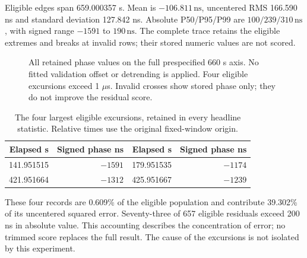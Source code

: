 \documentclass[10pt,letterpaper]{article}
\newcommand{\ns}{\,\mathrm{ns}}\newcommand{\us}{\,\mu\mathrm{s}}\newcommand{\code}[1]{\texttt{#1}}\newcolumntype{L}[1]{>{\RaggedRight\arraybackslash}p{#1}}\renewcommand{\arraystretch}{1.15}
\newcommand{\FineTrace}{(0.95144037500,-114) (1.95144093750,-10) (2.95144143750,-257) (3.95144200000,-204) (4.95144250000,-202) (5.95144306250,-263) (6.95144356250,-187) (7.95144406250,-192) (8.95144462500,-242) (9.95144512500,-218) (10.95144575000,-32) (11.95144625000,-89) (12.95144681250,-140) (13.95144731250,-74) (14.95144787500,-144) (15.95144837500,-138) (16.95144893750,-40) (17.95144943750,-106) (18.95145000000,-75) (19.95145050000,-198) (20.95145106250,-284) (21.95145162500,-94) (22.95145212500,22) (23.95145268750,-239) (24.95145318750,-24) (25.95145368750,-186) (26.95145425000,-166) (27.95145481250,-106) (28.95145531250,-200) (29.95145587500,-29) (30.95145637500,-158) (31.95145693750,-41) (32.95145743750,-193) (33.95145800000,-92) (34.95145856250,98) (35.95145906250,-19) (36.95145962500,-48) (37.95146012500,-239) (38.95146062500,-174) (39.95146118750,-180) (40.95146168750,-224) (41.95146225000,-235) (42.95146275000,-187) (43.95146331250,-168) (44.95146381250,-275) (45.95146431250,-259) (46.95146487500,-225) (47.95146543750,-40) (48.95146593750,-143) (49.95146650000,-97) (50.95146706250,19) (51.95146756250,-7) (52.95146812500,90) (53.95146862500,-38) (54.95146918750,-53) (55.95146968750,-78) (56.95147018750,-237) (57.95147075000,-180) (58.95147125000,-195) (59.95147175000,-150) (60.95147231250,-96) (61.95147281250,-200) (62.95147331250,-226) (63.95147387500,-310) (64.95147437500,-264) (65.95147493750,-176) (66.95147543750,-256) (67.95147600000,-206) (68.95147650000,-19) (69.95147706250,-199) (70.95147762500,-131) (71.95147812500,-224) (72.95147868750,-88) (73.95147918750,-239) (74.95147975000,-97) (75.95148025000,-87) (76.95148081250,11) (77.95148131250,-79) (78.95148187500,-95) (79.95148237500,-256) (80.95148293750,-224) (81.95148343750,-189) (82.95148400000,-65) (83.95148450000,-97) (84.95148506250,-115) (85.95148556250,-110) (86.95148612500,-256) (87.95148662500,-98) (88.95148712500,-22) (89.95148768750,-67) (90.95148818750,8) (91.95148875000,-23) (92.95148931250,-213) (93.95148981250,-121) (94.95149037500,-18) (95.95149087500,-68) (96.95149143750,-39) (97.95149193750,-123) (98.95149250000,-75) (99.95149300000,-102) (100.95149356250,-222) (101.95149406250,-109) (102.95149456250,-130) (103.95149512500,-77) (104.95149568750,-233) (105.95149618750,-84) (106.95149668750,-84) (107.95149725000,-198) (108.95149775000,-165) (109.95149831250,-88) (110.95149881250,-134) (111.95149937500,-166) (112.95149987500,-186) (113.95150043750,-198) (114.95150093750,-103) (115.95150150000,-153) (116.95150200000,-119) (117.95150250000,-123) (118.95150306250,-30) (119.95150356250,-107) (120.95150412500,-100) (121.95150468750,-144) (122.95150518750,-15) (123.95150575000,-199) (124.95150625000,-250) (125.95150675000,-147) (126.95150731250,-109) (127.95150781250,-57) (128.95150837500,-27) (129.95150887500,-149) (130.95150943750,-73) (131.95150993750,-181) (132.95151050000,-212) (133.95151100000,-41) (134.95151150000,-213) (135.95151206250,-71) (136.95151256250,-124) (137.95151312500,-168) (138.95151362500,-109) (139.95151418750,-74) (140.95151468750,-161) (141.95151525000,-1591) (142.95151575000,-354) (143.95151625000,-161) (144.95151681250,-115) (145.95151731250,-163) (146.95151787500,-232) (147.95151837500,-154) (148.95151893750,-97) (149.95151950000,5) (150.95152000000,-25) (151.95152050000,-136) (152.95152106250,-147) (153.95152156250,-54) (154.95152212500,-76) (155.95152262500,-271) (156.95152312500,-175) (157.95152368750,-225) (158.95152418750,-195) (159.95152475000,-62) (160.95152525000,40) (161.95152581250,55) (162.95152631250,17) (163.95152681250,-87) (164.95152737500,-62) (165.95152787500,-251) (166.95152843750,-160) (167.95152893750,-119) (168.95152950000,-33) (169.95153000000,-103) (170.95153050000,-90) (171.95153106250,-20) (172.95153156250,-186) (173.95153212500,-192) (174.95153262500,20) (175.95153318750,20) (176.95153368750,-108) (177.95153418750,-42) (178.95153468750,-134) (179.95153525000,-1174) (180.95153581250,-123) (181.95153631250,-101) (182.95153687500,-170) (183.95153737500,-222) (184.95153787500,-94) (185.95153843750,-13) (186.95153900000,-12) (187.95153950000,-90) (188.95154000000,-118) (189.95154056250,-75) (190.95154106250,-173) (191.95154162500,-197) (192.95154212500,-88) (193.95154268750,-48) (194.95154318750,-196) (195.95154368750,-137) (196.95154425000,-215) (197.95154475000,58) (198.95154525000,-78) (199.95154581250,-73) (200.95154631250,-177) (201.95154687500,-77) (202.95154737500,-84) (203.95154793750,-84) (204.95154843750,-53) (205.95154893750,-107) (206.95154943750,-283) (207.95155000000,-243) (208.95155050000,-279) (209.95155100000,-48) (210.95155156250,-14) (211.95155212500,81) (212.95155262500,-118) (213.95155318750,-19) (214.95155368750,-158) (215.95155418750,-195) (216.95155475000,-163) (217.95155525000,-197) (218.95155575000,-283) (219.95155631250,-213) (220.95155687500,-108) (221.95155737500,59) (222.95155787500,-54) (223.95155843750,-3) (224.95155893750,-58) (225.95155943750,-133) (226.95156000000,-65) (227.95156050000,-37) (228.95156106250,92) (229.95156156250,-32) (230.95156212500,-66) (231.95156262500,-104) (232.95156312500,24) (233.95156362500,-66) (234.95156418750,-108) (235.95156468750,-72) (236.95156525000,-28) (237.95156575000,4) (238.95156631250,-87) (239.95156681250,-96) (240.95156731250,-186) (241.95156781250,-160) (242.95156837500,19) (243.95156893750,-4) (244.95156943750,-130) (245.95157000000,79) (246.95157050000,150) (247.95157100000,-171) (248.95157156250,42) (249.95157200000,-202) (250.95157256250,-139) (251.95157306250,-75) (252.95157356250,29) (253.95157412500,-55) (254.95157468750,83) (255.95157518750,-127) (256.95157568750,-37) (257.95157618750,-111) (258.95157675000,-182) (259.95157725000,-34) (260.95157781250,-66) (261.95157831250,-136) (262.95157881250,-172) (263.95157931250,-90) (264.95157987500,-76) (265.95158043750,-179) (266.95158093750,-94) (267.95158143750,-122) (268.95158200000,-63) (269.95158250000,-21) (270.95158300000,-184) (271.95158356250,-143) (272.95158406250,-127) (273.95158456250,-66) (274.95158512500,-39) (275.95158562500,-128) (276.95158618750,33) (277.95158668750,-357) (278.95158718750,-198) (279.95158775000,-142) (280.95158825000,52) (281.95158875000,-87) (282.95158931250,-179) (283.95158981250,25) (284.95159031250,-25) (285.95159087500,-202) (286.95159137500,-56) (287.95159193750,-190) (288.95159243750,-148) (289.95159293750,-22) (290.95159350000,-96) (291.95159400000,-158) (292.95159456250,-139) (293.95159506250,-110) (294.95159556250,-48) (295.95159612500,-32) (296.95159662500,-103) (297.95159718750,-101) (298.95159775000,-55) (299.95159825000,47) (300.95159875000,-143) (301.95159925000,-159) (302.95159981250,-129) (303.95160031250,46) (304.95160081250,-195) (305.95160137500,-22) (306.95160193750,-86) (307.95160243750,-79) (308.95160300000,-2) (309.95160350000,-179) (310.95160400000,-106) (311.95160456250,-138) (312.95160506250,-35) (313.95160562500,33) (314.95160612500,-214) (315.95160668750,-114) (316.95160718750,-150) (317.95160775000,nan) (318.95160825000,-222) (319.95160881250,-31) (320.95160931250,-80) (321.95160987500,-145) (322.95161043750,nan) (323.95161100000,-68) (324.95161150000,-18) (325.95161200000,-228) (326.95161256250,-129) (327.95161306250,-45) (328.95161362500,12) (329.95161418750,-59) (330.95161468750,-39) (331.95161525000,-87) (332.95161575000,-112) (333.95161631250,-246) (334.95161687500,-151) (335.95161743750,-49) (336.95161793750,-128) (337.95161850000,46) (338.95161906250,26) (339.95161956250,-29) (340.95162012500,-89) (341.95162068750,-58) (342.95162118750,-56) (343.95162168750,-108) (344.95162225000,-86) (345.95162281250,-109) (346.95162337500,-72) (347.95162387500,-122) (348.95162443750,-136) (349.95162500000,-81) (350.95162556250,190) (351.95162606250,-157) (352.95162662500,17) (353.95162718750,19) (354.95162768750,-95) (355.95162825000,-41) (356.95162881250,2) (357.95162931250,-109) (358.95162987500,-88) (359.95163037500,-223) (360.95163093750,-220) (361.95163150000,-69) (362.95163200000,-145) (363.95163256250,-178) (364.95163312500,-121) (365.95163368750,-135) (366.95163425000,90) (367.95163475000,-33) (368.95163531250,20) (369.95163581250,-229) (370.95163637500,-104) (371.95163687500,-132) (372.95163743750,-123) (373.95163800000,-79) (374.95163850000,-71) (375.95163906250,-82) (376.95163962500,-175) (377.95164018750,-161) (378.95164075000,-133) (379.95164131250,-100) (380.95164187500,-69) (381.95164243750,-99) (382.95164293750,-206) (383.95164350000,-58) (384.95164400000,-31) (385.95164456250,62) (386.95164512500,-29) (387.95164568750,-66) (388.95164625000,83) (389.95164675000,-169) (390.95164731250,-97) (391.95164787500,-107) (392.95164837500,-84) (393.95164900000,-157) (394.95164950000,-56) (395.95165006250,-101) (396.95165062500,-58) (397.95165112500,-37) (398.95165168750,-13) (399.95165225000,53) (400.95165281250,21) (401.95165331250,-261) (402.95165393750,-88) (403.95165443750,-273) (404.95165500000,-269) (405.95165556250,-102) (406.95165606250,-6) (407.95165662500,-147) (408.95165712500,-184) (409.95165768750,-98) (410.95165825000,-150) (411.95165881250,-157) (412.95165937500,-175) (413.95165993750,-38) (414.95166050000,36) (415.95166100000,-104) (416.95166156250,-147) (417.95166212500,15) (418.95166275000,23) (419.95166325000,-54) (420.95166381250,-214) (421.95166437500,-1312) (422.95166493750,-54) (423.95166550000,-70) (424.95166606250,-43) (425.95166656250,-1239) (426.95166712500,-46) (427.95166768750,-4) (428.95166825000,3) (429.95166875000,-95) (430.95166931250,-55) (431.95166993750,-53) (432.95167043750,-118) (433.95167100000,149) (434.95167156250,76) (435.95167212500,-110) (436.95167268750,-54) (437.95167318750,10) (438.95167375000,-133) (439.95167431250,-159) (440.95167487500,0) (441.95167543750,-10) (442.95167600000,-176) (443.95167650000,-266) (444.95167706250,-113) (445.95167762500,-59) (446.95167818750,91) (447.95167875000,-9) (448.95167931250,-100) (449.95167987500,59) (450.95168043750,89) (451.95168100000,51) (452.95168150000,111) (453.95168206250,-48) (454.95168262500,-98) (455.95168318750,-61) (456.95168375000,-66) (457.95168431250,-70) (458.95168481250,-62) (459.95168543750,-67) (460.95168593750,-160) (461.95168650000,-235) (462.95168706250,-215) (463.95168762500,-171) (464.95168818750,-14) (465.95168875000,-53) (466.95168931250,-104) (467.95168987500,92) (468.95169043750,-177) (469.95169100000,-12) (470.95169156250,-82) (471.95169206250,-142) (472.95169268750,-35) (473.95169318750,10) (474.95169375000,-110) (475.95169431250,-23) (476.95169487500,-47) (477.95169543750,-98) (478.95169593750,28) (479.95169650000,-81) (480.95169706250,12) (481.95169762500,-150) (482.95169818750,-94) (483.95169875000,-88) (484.95169931250,-65) (485.95169987500,-29) (486.95170043750,38) (487.95170093750,-72) (488.95170150000,184) (489.95170206250,5) (490.95170262500,-160) (491.95170318750,-11) (492.95170375000,-19) (493.95170431250,-18) (494.95170487500,-155) (495.95170537500,-244) (496.95170593750,-163) (497.95170650000,-36) (498.95170706250,-142) (499.95170762500,-74) (500.95170818750,-89) (501.95170875000,-140) (502.95170931250,-20) (503.95170987500,-89) (504.95171043750,-23) (505.95171093750,-197) (506.95171150000,-207) (507.95171206250,-85) (508.95171262500,-192) (509.95171318750,-140) (510.95171375000,-161) (511.95171431250,-76) (512.95171487500,-122) (513.95171543750,-135) (514.95171600000,-169) (515.95171656250,-142) (516.95171706250,-151) (517.95171762500,-153) (518.95171818750,-181) (519.95171875000,-148) (520.95171931250,-212) (521.95171987500,-128) (522.95172043750,-80) (523.95172100000,-128) (524.95172156250,83) (525.95172212500,-124) (526.95172262500,-289) (527.95172325000,-170) (528.95172381250,-132) (529.95172431250,-76) (530.95172487500,-130) (531.95172543750,-92) (532.95172600000,-112) (533.95172656250,-168) (534.95172712500,-7) (535.95172768750,-65) (536.95172825000,-173) (537.95172881250,-212) (538.95172937500,-75) (539.95172993750,-166) (540.95173050000,-136) (541.95173106250,-106) (542.95173162500,-105) (543.95173218750,-140) (544.95173275000,-112) (545.95173331250,-98) (546.95173381250,-95) (547.95173437500,-137) (548.95173493750,-71) (549.95173550000,-211) (550.95173606250,-199) (551.95173662500,-126) (552.95173718750,-81) (553.95173775000,-121) (554.95173831250,-108) (555.95173887500,-186) (556.95173943750,-23) (557.95174006250,134) (558.95174056250,63) (559.95174112500,-37) (560.95174175000,-32) (561.95174231250,27) (562.95174281250,-92) (563.95174337500,-140) (564.95174393750,-175) (565.95174450000,-29) (566.95174506250,-37) (567.95174562500,-85) (568.95174618750,-125) (569.95174675000,-89) (570.95174731250,-61) (571.95174787500,-152) (572.95174850000,35) (573.95174906250,-42) (574.95174956250,-192) (575.95175012500,-50) (576.95175068750,-18) (577.95175125000,-41) (578.95175181250,-161) (579.95175237500,-110) (580.95175293750,-113) (581.95175350000,-54) (582.95175406250,-183) (583.95175462500,-67) (584.95175518750,-97) (585.95175575000,-186) (586.95175631250,-40) (587.95175687500,-36) (588.95175743750,-65) (589.95175800000,7) (590.95175856250,-26) (591.95175912500,-33) (592.95175968750,-33) (593.95176025000,-77) (594.95176081250,-190) (595.95176137500,-104) (596.95176193750,-67) (597.95176250000,-70) (598.95176306250,-122) (599.95176362500,-159) (600.95176418750,4) (601.95176475000,-61) (602.95176531250,-138) (603.95176587500,-97) (604.95176643750,-179) (605.95176700000,-13) (606.95176756250,-80) (607.95176812500,-157) (608.95176868750,-23) (609.95176925000,-197) (610.95176987500,-162) (611.95177043750,-116) (612.95177100000,-58) (613.95177156250,-181) (614.95177212500,-169) (615.95177268750,-131) (616.95177325000,-8) (617.95177381250,59) (618.95177443750,-8) (619.95177500000,-29) (620.95177550000,-161) (621.95177606250,-58) (622.95177662500,8) (623.95177718750,-107) (624.95177775000,-126) (625.95177831250,-49) (626.95177887500,-111) (627.95177943750,-44) (628.95178000000,-142) (629.95178056250,-208) (630.95178112500,-171) (631.95178168750,-299) (632.95178225000,-154) (633.95178287500,-96) (634.95178343750,-114) (635.95178400000,nan) (636.95178456250,-36) (637.95178512500,-13) (638.95178568750,-188) (639.95178625000,-62) (640.95178681250,-36) (641.95178737500,-84) (642.95178793750,-41) (643.95178856250,-90) (644.95178912500,-45) (645.95178962500,-107) (646.95179018750,-143) (647.95179081250,-129) (648.95179137500,-165) (649.95179193750,-111) (650.95179250000,-74) (651.95179306250,-122) (652.95179362500,-179) (653.95179418750,-164) (654.95179475000,-56) (655.95179531250,-168) (656.95179587500,-83) (657.95179643750,-79) (658.95179706250,-94) (659.95179756250,1)}
\newcommand{\InvalidTrace}{(317.95160775000,0) (322.95161043750,0) (635.95178400000,0)}
\begin{document}
Eligible edges span 659.000357 s. Mean is $-106.811\ns$, uncentered RMS 166.590 ns and standard deviation 127.842 ns. Absolute P50/P95/P99 are $100/239/310\ns$, with signed range $-1591$ to $190\ns$. The complete trace retains the eligible extremes and breaks at invalid rows; their stored numeric values are not scored.

\begin{figure}[ht]
\centering{}
\caption{All retained phase values on the full prespecified 660 s axis. No fitted validation offset or detrending is applied. Four eligible excursions exceed 1 $\mu$s. Invalid crosses show stored phase only; they do not improve the residual score.}
\end{figure}

\begin{table}[ht]\centering\small
\caption{The four largest eligible excursions, retained in every headline statistic. Relative times use the original fixed-window origin.}
\begin{tabular}{rrrr}\toprule
Elapsed s & Signed phase ns & Elapsed s & Signed phase ns\\\midrule
141.951515 &$-1591$&179.951535 &$-1174$\\
421.951664 &$-1312$&425.951667 &$-1239$\\\bottomrule
\end{tabular}\end{table}

These four records are 0.609\% of the eligible population and contribute 39.302\% of its uncentered squared error. Seventy-three of 657 eligible residuals exceed 200 ns in absolute value. This accounting describes the concentration of error; no trimmed score replaces the full result. The cause of the excursions is not isolated by this experiment.
\end{document}
